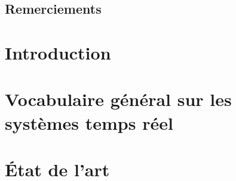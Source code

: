 \documentclass[11pt,a4paper,oneside]{report}
\begin{document}
	\newenvironment{vcenterpage}
	{\newpage\thispagestyle{empty} 
		\vspace*{\fill}}
	{\vspace*{\fill}\par\pagebreak}
	
	\thispagestyle{empty} 
	\setcounter{page}{0}
	\tableofcontents
	
%	

	

	
\section*{Remerciements}

\newpage

\chapter*{Introduction}{}
	\setcounter{page}{1}

	
\chapter{Vocabulaire général sur les systèmes temps réel}
	
	
\chapter{État de l'art}
	
\end{document}
